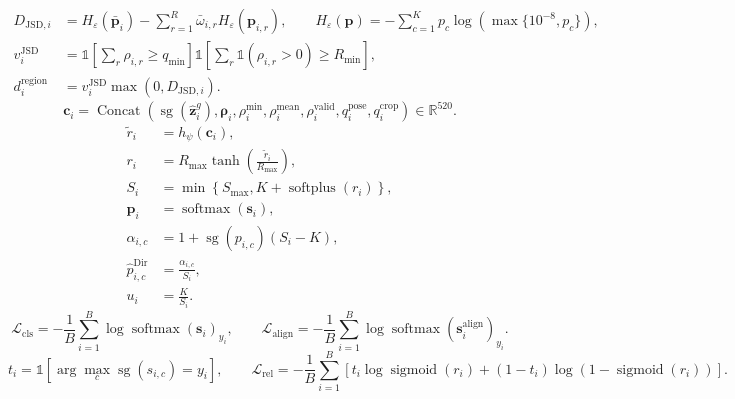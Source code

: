 \documentclass{article}
\begin{document}
\begin{equation}
\begin{aligned}
D_{\mathrm{JSD},i}
&=
H_{\varepsilon}\!\left(\bar{\mathbf{p}}_i\right)
-
\sum_{r=1}^{R}
\bar{\omega}_{i,r}H_{\varepsilon}\!\left(\mathbf{p}_{i,r}\right),
\qquad
H_{\varepsilon}(\mathbf{p})=-\sum_{c=1}^{K}p_c\log\!\left(\max\{10^{-8},p_c\}\right), \\
v_i^{\mathrm{JSD}}
&=
\mathbb{1}\!\left[
\sum_r\rho_{i,r}\ge q_{\min}
\right]
\mathbb{1}\!\left[
\sum_r\mathbb{1}(\rho_{i,r}>0)\ge R_{\min}
\right], \\
d_i^{\mathrm{region}}
&=
v_i^{\mathrm{JSD}}\max\!\left(0,D_{\mathrm{JSD},i}\right).
\end{aligned}
\tag{15}
\end{equation}
\begin{equation}
\mathbf{c}_i
=
\operatorname{Concat}\!\left(
\operatorname{sg}(\widehat{\mathbf{z}}^{g}_i),
\boldsymbol{\rho}_i,
\rho_i^{\min},
\rho_i^{\mathrm{mean}},
\rho_i^{\mathrm{valid}},
q_i^{\mathrm{pose}},
q_i^{\mathrm{crop}}
\right)
\in\mathbb{R}^{520}.
\tag{16}
\end{equation}
\begin{equation}
\begin{aligned}
\widetilde{r}_i
&=h_{\psi}(\mathbf{c}_i), \\
r_i
&=R_{\max}\tanh\!\left(
\frac{\widetilde{r}_i}{R_{\max}}
\right), \\
S_i
&=\min\!\left\{
S_{\max},
K+\operatorname{softplus}(r_i)
\right\}, \\
\mathbf{p}_i
&=\operatorname{softmax}(\mathbf{s}_i), \\
\alpha_{i,c}
&=1+\operatorname{sg}(p_{i,c})(S_i-K), \\
\widehat{p}^{\mathrm{Dir}}_{i,c}
&=\frac{\alpha_{i,c}}{S_i}, \\
u_i
&=\frac{K}{S_i}.
\end{aligned}
\tag{17}
\end{equation}
\begin{equation}
\mathcal{L}_{\mathrm{cls}}
=
-\frac{1}{B}\sum_{i=1}^{B}
\log\operatorname{softmax}(\mathbf{s}_i)_{y_i},
\qquad
\mathcal{L}_{\mathrm{align}}
=
-\frac{1}{B}\sum_{i=1}^{B}
\log\operatorname{softmax}(\mathbf{s}^{\mathrm{align}}_i)_{y_i}.
\tag{18}
\end{equation}
\begin{equation}
t_i
=
\mathbb{1}\!\left[
\arg\max_c \operatorname{sg}(s_{i,c})=y_i
\right],
\qquad
\mathcal{L}_{\mathrm{rel}}
=
-\frac{1}{B}\sum_{i=1}^{B}
\left[
t_i\log\operatorname{sigmoid}(r_i)
+(1-t_i)\log\!\left(1-\operatorname{sigmoid}(r_i)\right)
\right].
\tag{19}
\end{equation}
\end{document}
